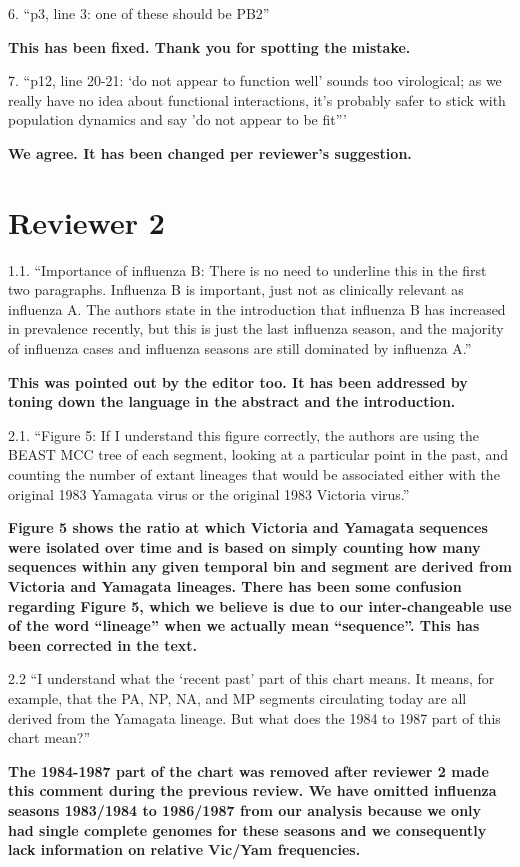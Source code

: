 \documentclass[11pt,oneside,letterpaper]{article}
\begin{document}
6. ``p3, line 3: one of these should be PB2''

\textbf{This has been fixed. Thank you for spotting the mistake.}

7. ``p12, line 20-21: `do not appear to function well' sounds too virological; as we really have no idea about functional interactions, it's probably safer to stick with population dynamics and say 'do not appear to be fit'''

\textbf{We agree. It has been changed per reviewer's suggestion.}

\section*{Reviewer 2}

1.1. ``Importance of influenza B: There is no need to underline this in the first two paragraphs.
Influenza B is important, just not as clinically relevant as influenza A.
The authors state in the introduction that influenza B has increased in prevalence recently, but this is just the last influenza season, and the majority of influenza cases and influenza seasons are still dominated by influenza A.''

\textbf{This was pointed out by the editor too.
It has been addressed by toning down the language in the abstract and the introduction.}

2.1. ``Figure 5: If I understand this figure correctly, the authors are using the BEAST MCC tree of each segment, looking at a particular point in the past, and counting the number of extant lineages that would be associated either with the original 1983 Yamagata virus or the original 1983 Victoria virus.''

\textbf{Figure 5 shows the ratio at which Victoria and Yamagata sequences were isolated over time and is based on simply counting how many sequences within any given temporal bin and segment are derived from Victoria and Yamagata lineages.
There has been some confusion regarding Figure 5, which we believe is due to our inter-changeable use of the word ``lineage'' when we actually mean ``sequence''.
This has been corrected in the text.}

2.2 ``I understand what the `recent past' part of this chart means.
It means, for example, that the PA, NP, NA, and MP segments circulating today are all derived from the Yamagata lineage.
But what does the 1984 to 1987 part of this chart mean?''

\textbf{The 1984-1987 part of the chart was removed after reviewer 2 made this comment during the previous review.
We have omitted influenza seasons 1983/1984 to 1986/1987 from our analysis because we only had single complete genomes for these seasons and we consequently lack information on relative Vic/Yam frequencies.}
\end{document}
